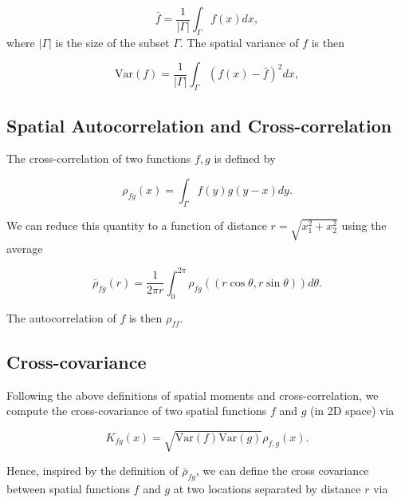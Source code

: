 \documentclass{article}
\begin{document}
\begin{equation}
  \bar f = \frac{1}{|\Gamma|}\int_\Gamma f(x)dx,
\end{equation} where \(|\Gamma|\) is the size of the subset \(\Gamma\).
The spatial variance of \(f\) is then

\begin{equation}
  \mathrm{Var}(f) = \frac{1}{|\Gamma|}\int_\Gamma (f(x)-\bar f)^2dx,
\end{equation}

\hypertarget{spatial-autocorrelation-and-cross-correlation}{%
\subsection{\texorpdfstring{Spatial Autocorrelation and
Cross-correlation
\label{corr-defs}}{Spatial Autocorrelation and Cross-correlation }}\label{spatial-autocorrelation-and-cross-correlation}}

The cross-correlation of two functions \(f,g\) is defined by

\begin{equation}
  \rho_{fg}(x)=\int_\Gamma f(y)g(y-x)dy.
\end{equation}

We can reduce this quantity to a function of distance
\(r=\sqrt{x_1^2+x_2^2}\) using the average

\begin{equation}
  \bar\rho_{fg}(r)=\frac{1}{2\pi r}\int_0^{2\pi}\rho_{fg}((r\cos\theta,r\sin\theta))d\theta.
\end{equation}

The autocorrelation of \(f\) is then \(\rho_{ff}\).

\hypertarget{cross-covariance}{%
\subsection{Cross-covariance}\label{cross-covariance}}

Following the above definitions of spatial moments and
cross-correlation, we compute the cross-covariance of two spatial
functions \(f\) and \(g\) (in 2D space) via

\begin{equation}
  K_{fg}(x)=\sqrt{\mathrm{Var}(f)\mathrm{Var}(g)}\rho_{f,g}(x).
\end{equation}

Hence, inspired by the definition of \(\bar\rho_{fg}\), we can define
the cross covariance between spatial functions \(f\) and \(g\) at two
locations separated by distance \(r\) via
\end{document}
